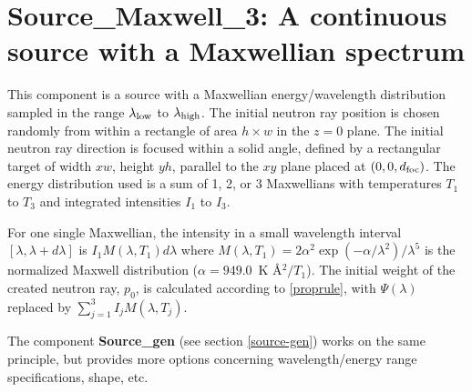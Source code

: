 \section{Source\_Maxwell\_3: A continuous source
with a Maxwellian spectrum}
\label{source-maxwell}


This component is a source with a Maxwellian energy/wavelength distribution
sampled in the range $\lambda_{\rm low}$ to $\lambda_{\rm high}$.
The initial neutron ray position is chosen randomly from within a
rectangle of area $h \times w$ in the $z=0$ plane.
The initial neutron ray direction is focused within
a solid angle, defined by a rectangular target of width
$xw$, height $yh$, parallel to
the $xy$ plane placed at $(0,0,d_{\rm foc})$.
The energy distribution used is a sum of 1, 2, or 3 Maxwellians with
temperatures $T_1$ to $T_3$ and integrated intensities $I_1$ to $I_3$.

For one single Maxwellian,
the intensity in a small wavelength interval $[\lambda, \lambda+d\lambda]$ is
$ I_1 M(\lambda,T_1) d\lambda $
where
$M(\lambda,T_1) = 2 \alpha^2 \exp(-\alpha/\lambda^2) / \lambda^5 $
is the normalized Maxwell distribution ($\alpha=949.0$~K \AA$^2/T_1$).
The initial weight of the created neutron ray, $p_0$, is
calculated according to \ref{proprule}, with $\Psi(\lambda)$ replaced
by $\sum_{j=1}^3 I_j M(\lambda,T_j)$.

%
%

The component {\bf Source\_gen} (see section \ref{source-gen})
works on the same principle, but provides more options concerning
wavelength/energy range specifications, shape, etc.

